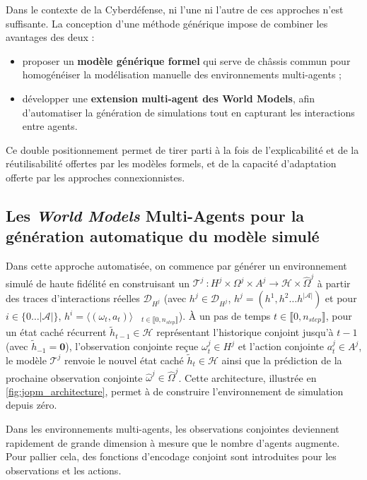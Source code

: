 Dans le contexte de la Cyberdéfense, ni l'une ni l'autre de ces approches n'est suffisante. La conception d'une méthode générique impose de combiner les avantages des deux :
\begin{itemize}
  \item proposer un \textbf{modèle générique formel} qui serve de châssis commun pour homogénéiser la modélisation manuelle des environnements multi-agents ;
  \item développer une \textbf{extension multi-agent des World Models}, afin d'automatiser la génération de simulations tout en capturant les interactions entre agents.
\end{itemize}

Ce double positionnement permet de tirer parti à la fois de l'explicabilité et de la réutilisabilité offertes par les modèles formels, et de la capacité d'adaptation offerte par les approches connexionnistes.


\subsection{Les \textit{World Models} Multi-Agents pour la génération automatique du modèle simulé}

Dans cette approche automatisée, on commence par générer un environnement simulé de haute fidélité en construisant un  $\mathcal{T}^j~: H^j \times \Omega^j \times A^j \rightarrow \mathcal{H} \times \hat{\Omega}^j$ à partir des traces d'interactions réelles $\mathcal{D}_{H^j}$ (avec $h^j \in \mathcal{D}_{H^j}$, $h^j = (h^1, h^2 \dots h^{|\mathcal{A}|})$ et pour $i \in \{0\dots|\mathcal{A}|\}$, $h^i = \langle (\omega_t, a_t) \rangle\phantom{X}_{t \in \llbracket 0, n_{step} \rrbracket}$). À un pas de temps $t \in \llbracket 0, n_{step} \rrbracket$, pour un état caché récurrent $\tilde{h}_{t-1} \in \mathcal{H}$ représentant l'historique conjoint jusqu'à $t-1$ (avec $\tilde{h}_{-1} = \mathbf{0}$), l'observation conjointe reçue $\omega_t^j \in H^j$ et l'action conjointe $a_t^j \in A^j$, le modèle $\mathcal{T}^j$ renvoie le nouvel état caché $\tilde{h}_t \in \mathcal{H}$ ainsi que la prédiction de la prochaine observation conjointe $\hat{\omega}^j \in \hat{\Omega}^j$. Cette architecture, illustrée en \autoref{fig:jopm_architecture}, permet à  de construire l'environnement de simulation depuis zéro.

Dans les environnements multi-agents, les observations conjointes deviennent rapidement de grande dimension à mesure que le nombre d'agents augmente. Pour pallier cela, des fonctions d'encodage conjoint sont introduites pour les observations et les actions.

